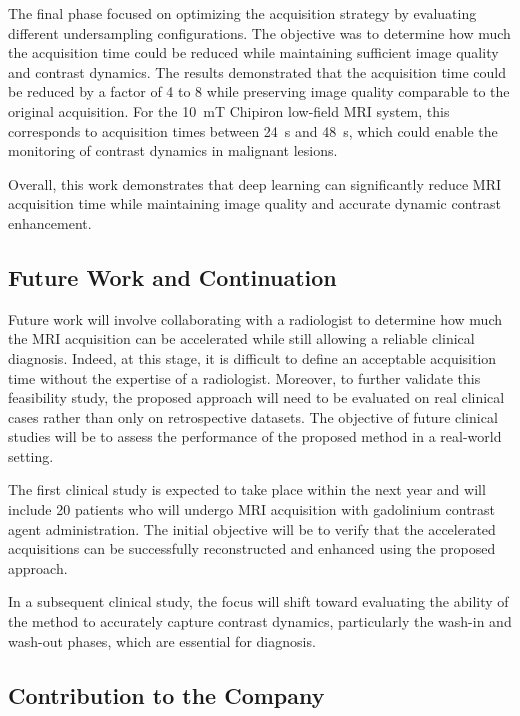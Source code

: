 \documentclass[12pt]{article}
\begin{document}
The final phase focused on optimizing the acquisition strategy by evaluating different undersampling configurations. 
The objective was to determine how much the acquisition time could be reduced while maintaining sufficient image quality and contrast dynamics. 
The results demonstrated that the acquisition time could be reduced by a factor of 4 to 8 while preserving image quality comparable to the original acquisition.
For the 10~mT Chipiron low-field MRI system, this corresponds to acquisition times between 24~s and 48~s, which could enable the monitoring of contrast dynamics in malignant lesions.
\vspace{0.5cm}

Overall, this work demonstrates that deep learning can significantly reduce MRI acquisition time while maintaining image quality and accurate dynamic contrast enhancement.

\subsection{Future Work and Continuation}
Future work will involve collaborating with a radiologist to determine how much the MRI acquisition can be accelerated while still allowing a reliable clinical diagnosis.
Indeed, at this stage, it is difficult to define an acceptable acquisition time without the expertise of a radiologist.
Moreover, to further validate this feasibility study, the proposed approach will need to be evaluated on real clinical cases rather than only on retrospective datasets.
The objective of future clinical studies will be to assess the performance of the proposed method in a real-world setting. 
\vspace{0.5cm}

The first clinical study is expected to take place within the next year and will include 20 patients who will undergo MRI acquisition with gadolinium contrast agent administration. 
The initial objective will be to verify that the accelerated acquisitions can be successfully reconstructed and enhanced using the proposed approach.
\vspace{0.5cm}

In a subsequent clinical study, the focus will shift toward evaluating the ability of the method to accurately capture contrast dynamics, particularly the wash-in and wash-out phases, which are essential for diagnosis.

\subsection{Contribution to the Company}
\end{document}
